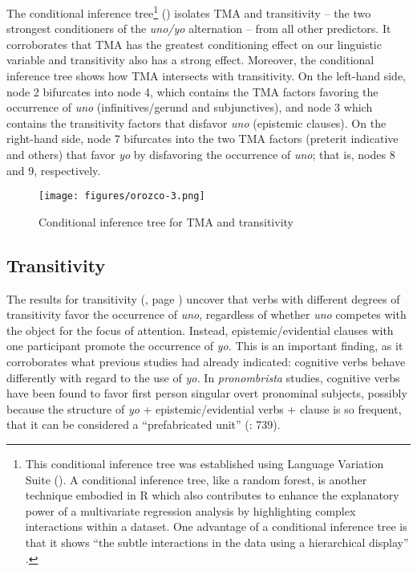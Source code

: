 \documentclass[output=paper]{langscibook}
\begin{document}
The conditional inference tree\footnote{This conditional inference tree was established using Language Variation Suite (\citealt{ScrivnerDíaz-Campos2016}). A conditional inference tree, like a random forest, is another technique embodied in R which also contributes to enhance the explanatory power of a multivariate regression analysis by highlighting complex interactions within a dataset. One advantage of a conditional inference tree is that it shows “the subtle interactions in the data using a hierarchical display” \citep[153]{Tagliamonte2012}.}  () isolates TMA and transitivity – the two strongest conditioners of the \textit{uno/yo} alternation – from all other predictors. It corroborates that TMA has the greatest conditioning effect on our linguistic variable and transitivity also has a strong effect. Moreover, the conditional inference tree shows how TMA intersects with transitivity. On the left-hand side, node 2 bifurcates into node 4, which contains the TMA factors favoring the occurrence of \textit{uno} (infinitives/gerund and subjunctives), and node 3 which contains the transitivity factors that disfavor \textit{uno} (epistemic clauses). On the right-hand side, node 7 bifurcates into the two TMA factors (preterit indicative and others) that favor \textit{yo} by disfavoring the occurrence of \textit{uno}; that is, nodes 8 and 9, respectively. 

\begin{figure}[H]
\texttt{[image: figures/orozco-3.png]}
\caption{\label{fig:orozco:3}Conditional inference tree for TMA and transitivity}
\end{figure}

\subsection{Transitivity}\label{sec:orozco:4.4}

The results for transitivity (, page \pageref{tab:orozco:5}) uncover that verbs with different degrees of transitivity favor the occurrence of \textit{uno}, regardless of whether \textit{uno} competes with the object for the focus of attention. Instead, epistemic/evidential clauses with one participant promote the occurrence of \textit{yo.} This is an important finding, as it corroborates what previous studies had already indicated: cognitive verbs behave differently with regard to the use of \textit{yo.} In \textit{pronombrista} studies, cognitive verbs have been found to favor first person singular overt pronominal subjects, possibly because the structure of \textit{yo} + epistemic/evidential verbs + clause is so frequent, that it can be considered a “prefabricated unit” (\citealt{TravisTorresCacoullos2012}: 739).
\end{document}
